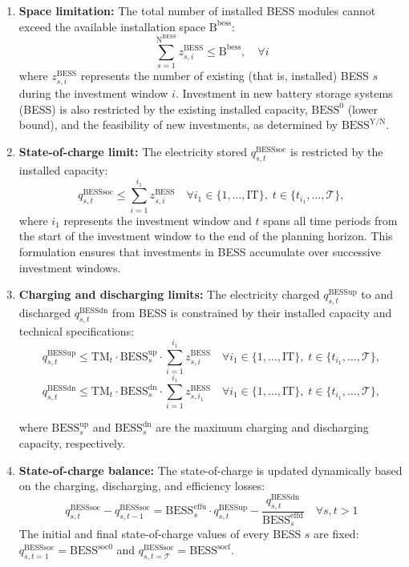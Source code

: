 \documentclass[11pt]{article}
\begin{document}
\begin{enumerate}
    \item \textbf{Space limitation:}
    The total number of installed BESS modules cannot exceed the available installation space \(\text{B}^\text{bess}\):
    \[
    \sum_{s=1}^{\text{N}^\text{BESS}} z^\text{BESS}_{s,i} \leq \text{B}^\text{bess},
    \quad
    \forall i
    \]
    where \(z^\text{BESS}_{s,i}\) represents the number of existing (that is, installed) BESS \(s\) during the investment window \(i\). Investment in new battery storage systems (BESS) is also restricted by the existing installed capacity, \(\text{BESS}^\text{0}\) (lower bound), and the feasibility of new investments, as determined by \(\text{BESS}^\text{Y/N}\).
    
    \item \textbf{State-of-charge limit:}
    The electricity stored \(q^\text{BESSsoc}_{s,t}\) is restricted by the installed capacity:
    \[
    q^\text{BESSsoc}_{s,t} \leq  \sum_{i=1}^{i_1}z^\text{BESS}_{s,i}
    \quad
    \forall i_1 \in \{1, \dots, \text{IT}\}, \; t \in \{t_{i_1}, \dots, \mathcal{T}\},
    \]
    where \(i_1\) represents the investment window and \(t\) spans all time periods from the start of the investment window to the end of the planning horizon. This formulation ensures that investments in BESS accumulate over successive investment windows.

    \item \textbf{Charging and discharging limits:}
    The electricity charged \(q^\text{BESSup}_{s,t}\) to and discharged \(q^\text{BESSdn}_{s,t}\) from BESS is constrained by their installed capacity and technical specifications:
    \[
    q^\text{BESSup}_{s,t} \leq  \text{TM}_t \cdot \text{BESS}^\text{up}_s \cdot \sum_{i=1}^{i_1}z^\text{BESS}_{s,i}
    \quad
    \forall i_1 \in \{1, \dots, \text{IT}\}, \; t \in \{t_{i_1}, \dots, \mathcal{T}\},
    \]
    \[
    q^\text{BESSdn}_{s,t} \leq \text{TM}_t \cdot \text{BESS}^\text{dn}_s \cdot \sum_{i=1}^{i_1}z^\text{BESS}_{s,i_1}
    \quad
    \forall i_1 \in \{1, \dots, \text{IT}\}, \; t \in \{t_{i_1}, \dots, \mathcal{T}\},
    \]

    where \(\text{BESS}^\text{up}_s\) and \(\text{BESS}^\text{dn}_s\) are the maximum charging and discharging capacity, respectively. 

    \item \textbf{State-of-charge balance:}
    The state-of-charge is updated dynamically based on the charging, discharging, and efficiency losses:
    \[
    q^\text{BESSsoc}_{s,t} - q^\text{BESSsoc}_{s,t-1} = \text{BESS}^\text{effu}_s \cdot q^\text{BESSup}_{s,t} - \frac{q^\text{BESSdn}_{s,t}}{\text{BESS}^\text{effd}_s}
    \quad
    \forall s,t>1
    \]
    The initial and final state-of-charge values of every BESS \(s\) are fixed: \(q^\text{BESSsoc}_{s,t=1} = \text{BESS}^\text{soc0}\) and \(q^\text{BESSsoc}_{s,t=\mathcal{T}} = \text{BESS}^\text{socf}\).


\end{enumerate}
\end{document}
